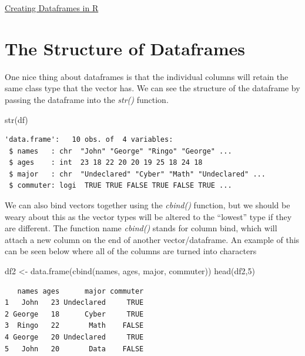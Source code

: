 \documentclass[
  letterpaper,
  DIV=11,
  numbers=noendperiod]{scrreprt}
\newenvironment{Shaded}{\begin{snugshade}}{\end{snugshade}}
\newcommand{\DecValTok}[1]{\textcolor[rgb]{0.68,0.00,0.00}{#1}}
\newcommand{\FunctionTok}[1]{\textcolor[rgb]{0.28,0.35,0.67}{#1}}
\newcommand{\NormalTok}[1]{\textcolor[rgb]{0.00,0.23,0.31}{#1}}
\newcommand{\OtherTok}[1]{\textcolor[rgb]{0.00,0.23,0.31}{#1}}
\begin{document}
\begin{watch}{}{}
    \href{https://youtu.be/KjMZt7-YDVQ}{Creating Dataframes in R}
\end{watch}

\section{The Structure of Dataframes}\label{the-structure-of-dataframes}

One nice thing about dataframes is that the individual columns will
retain the same class type that the vector has. We can see the structure
of the dataframe by passing the dataframe into the \emph{str()}
function.

\begin{Shaded}
\begin{Highlighting}[]
\FunctionTok{str}\NormalTok{(df)}
\end{Highlighting}
\end{Shaded}

\begin{verbatim}
'data.frame':   10 obs. of  4 variables:
 $ names   : chr  "John" "George" "Ringo" "George" ...
 $ ages    : int  23 18 22 20 20 19 25 18 24 18
 $ major   : chr  "Undeclared" "Cyber" "Math" "Undeclared" ...
 $ commuter: logi  TRUE TRUE FALSE TRUE FALSE TRUE ...
\end{verbatim}

We can also bind vectors together using the \emph{cbind()} function, but
we should be weary about this as the vector types will be altered to the
``lowest'' type if they are different. The function name \emph{cbind()}
stands for column bind, which will attach a new column on the end of
another vector/dataframe. An example of this can be seen below where all
of the columns are turned into characters

\begin{Shaded}
\begin{Highlighting}[]
\NormalTok{df2 }\OtherTok{\textless{}{-}} \FunctionTok{data.frame}\NormalTok{(}\FunctionTok{cbind}\NormalTok{(names, ages, major, commuter))}
\FunctionTok{head}\NormalTok{(df2,}\DecValTok{5}\NormalTok{)}
\end{Highlighting}
\end{Shaded}

\begin{verbatim}
   names ages      major commuter
1   John   23 Undeclared     TRUE
2 George   18      Cyber     TRUE
3  Ringo   22       Math    FALSE
4 George   20 Undeclared     TRUE
5   John   20       Data    FALSE
\end{verbatim}
\end{document}
